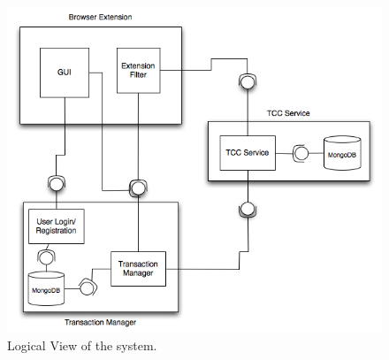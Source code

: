 \begin{figure} [ht]
\centering
\includegraphics[scale=0.75]{images/logical_view.jpg}
\caption{Logical View of the system.}
\label{tcc-logical-view}
\end{figure}

